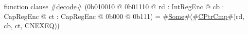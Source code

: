 function clause #\hyperref[zdecode]{decode}# (0b010010 @ 0b01110 @ rd : IntRegEnc @ cb : CapRegEnc @ ct : CapRegEnc @ 0b000 @ 0b111) = #\hyperref[zSome]{Some}#(#\hyperref[zCPtrCmp]{CPtrCmp}#(rd, cb, ct, CNEXEQ))
